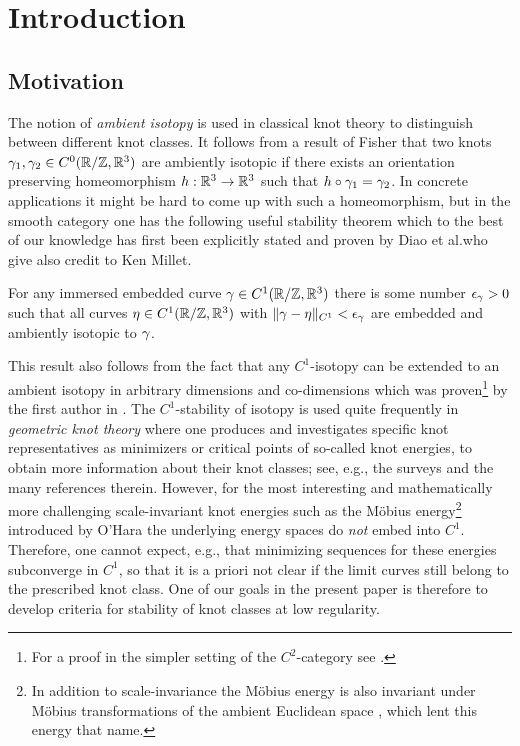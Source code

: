 \section{Introduction}


\subsection{Motivation}
The notion of \emph{ambient isotopy} is used in classical knot theory
to distinguish between different knot classes. It follows from a result
of Fisher \cite[Theorem~15]{fisher_1960} that 
two knots $\gamma_1,\gamma_2\in C^0(\mathbb{R}/\mathbb{Z},\mathbb{R}^3)$
are ambiently isotopic if there exists an orientation preserving
homeomorphism $h:\mathbb{R}^3\to\mathbb{R}^3$ such that $h\circ\gamma_1=\gamma_2$. In concrete applications
it might be hard to come up with such a homeomorphism, but in the smooth category one
has the following useful stability theorem which to the best of our knowledge
has first been explicitly stated and proven by Diao et al.\@ who give also credit
to Ken Millet.
\begin{externaltheorem}
\label{thm:C1-stability}
For any immersed embedded curve $\gamma\in C^1(\mathbb{R}/\mathbb{Z},\mathbb{R}^3)$ there is some number
$\epsilon_\gamma>0$ such that all curves $\eta\in C^1(\mathbb{R}/\mathbb{Z},\mathbb{R}^3)$ with 
$\|\gamma-\eta\|_{C^1} < \epsilon_\gamma$ are embedded and ambiently isotopic to $\gamma$.
\end{externaltheorem}
This result also follows from the fact that any $C^1$-isotopy can be extended
to an ambient isotopy in arbitrary dimensions and co-dimensions which was proven\footnote{
For a proof in the simpler setting of the $C^2$-category see 
\cite[Chapter 8]{hirsch_1994}.}
by the first author in \cite{blatt_2009a}. The $C^1$-stability of isotopy is used
quite frequently in \emph{geometric knot theory} where one produces and investigates
specific knot representatives as minimizers or critical points of so-called
knot energies, 
to obtain more information about their knot classes; see, e.g., the
surveys 
\cite{strzelecki-vdm_2013a,strzelecki-etal_2013a,strzelecki-vdm_2014,blatt-reiter_2014,strzelecki-vdm_2018}  
and the many references therein. 
However, for the most interesting and mathematically more challenging
scale-invariant knot energies such as the M\"obius energy\footnote{In addition to 
scale-invariance the M\"obius energy is also invariant under M\"obius transformations
of the ambient Euclidean space \cite[Theorem~2.1]{freedman-etal_1994}, which lent
this energy that name.}
introduced by O'Hara \cite{ohara_1991a}
the underlying energy spaces do \emph{not} embed into $C^1$. Therefore,
one cannot expect, e.g., that minimizing sequences for these energies subconverge
in $C^1$, so that it is a priori not clear if the limit curves still belong to the
prescribed knot class. One of our goals in the present paper is therefore
to develop criteria
for stability of knot classes at low regularity.

